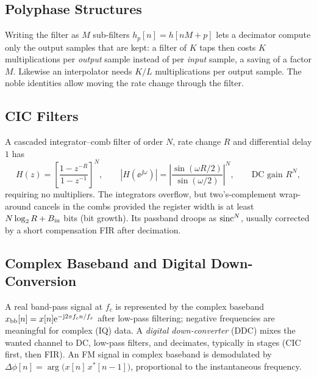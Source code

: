 \documentclass[11pt,a4paper]{article}
\begin{document}
\subsection{Polyphase Structures}
Writing the filter as $M$ sub-filters $h_p[n]=h[nM+p]$ lets a decimator compute only the output samples that are kept: a filter of $K$ taps then costs $K$ multiplications per \emph{output} sample instead of per \emph{input} sample, a saving of a factor $M$. Likewise an interpolator needs $K/L$ multiplications per output sample. The noble identities allow moving the rate change through the filter.

\subsection{CIC Filters}
A cascaded integrator--comb filter of order $N$, rate change $R$ and differential delay $1$ has
\begin{equation}
  H(z)=\left[\frac{1-z^{-R}}{1-z^{-1}}\right]^N,\qquad |H(\ee^{\jj\omega})|=\left|\frac{\sin(\omega R/2)}{\sin(\omega/2)}\right|^N,\qquad\text{DC gain }R^N,
  \label{eq:cic}
\end{equation}
requiring no multipliers. The integrators overflow, but two's-complement wrap-around cancels in the combs provided the register width is at least $N\log_2R+B_{\rm in}$ bits (bit growth). Its passband droops as $\operatorname{sinc}^N$, usually corrected by a short compensation FIR after decimation.

\subsection{Complex Baseband and Digital Down-Conversion}
A real band-pass signal at $f_c$ is represented by the complex baseband $x_{\rm bb}[n]=x[n]\mathrm{e}^{-\mathrm{j}2\pi f_cn/f_s}$ after low-pass filtering; negative frequencies are meaningful for complex (IQ) data. A \emph{digital down-converter} (DDC) mixes the wanted channel to DC, low-pass filters, and decimates, typically in stages (CIC first, then FIR). An FM signal in complex baseband is demodulated by $\Delta\phi[n]=\arg\big(x[n]\,x^\ast[n-1]\big)$, proportional to the instantaneous frequency.
\end{document}
